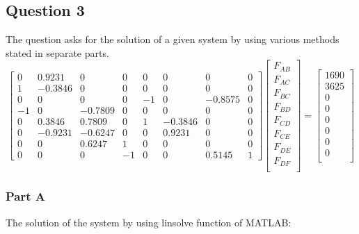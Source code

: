 \documentclass[12pt, a4paper]{article}
\begin{document}
\subsection{Question 3}
The question asks for the solution of a given system by using various methods stated in separate parts. 
\begin{equation}
\begin{bmatrix}
0 & 0.9231 & 0 & 0 & 0 & 0 & 0 & 0 \\
1 & -0.3846 & 0 & 0 & 0 & 0 & 0 & 0 \\
0 & 0 & 0 & 0 & -1 & 0 & -0.8575 & 0 \\
-1 & 0 & -0.7809 & 0 & 0 & 0 & 0 & 0 \\
0 & 0.3846 & 0.7809 & 0 & 1 & -0.3846 & 0 & 0 \\
0 & -0.9231 & -0.6247 & 0 & 0 & 0.9231 & 0 & 0 \\
0 & 0 & 0.6247 & 1 & 0 & 0 & 0 & 0 \\
0 & 0 & 0 & -1 & 0 & 0 & 0.5145 & 1
\end{bmatrix} 
\begin{bmatrix}
F_{A B} \\
F_{A C} \\
F_{B C} \\
F_{B D} \\
F_{C D} \\
F_{C E} \\
F_{D E} \\
F_{D F} \\
\end{bmatrix}= 
\begin{bmatrix}
1690 \\
3625 \\
0 \\
0 \\
0 \\
0 \\
0 \\
0 \\
\end{bmatrix}
\end{equation}

\subsubsection{Part A}

The solution of the system by using linsolve function of MATLAB:
\end{document}
